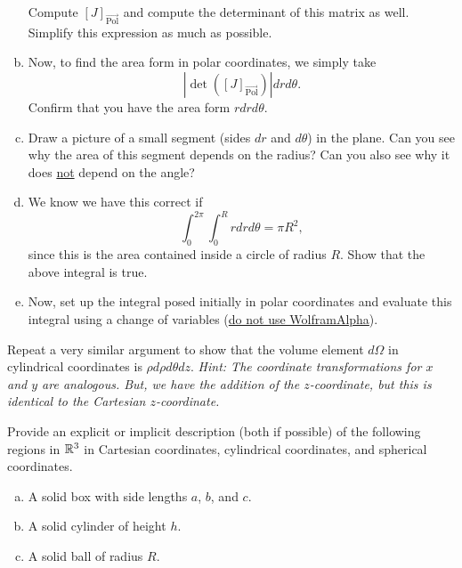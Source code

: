 \documentclass[12pt]{article} %
\begin{document}
\begin{problem}
\begin{enumerate}[(a)]
        Compute $[J]_{\vec{\textrm{Pol}}}$ and compute the determinant of this matrix as well. Simplify this expression as much as possible.
        \item Now, to find the area form in polar coordinates, we simply take
        \[
        \left|\det\left([J]_{\vec{\textrm{Pol}}}\right)\right|drd\theta.
        \]
        Confirm that you have the area form $rdrd\theta$.
        \item Draw a picture of a small segment (sides $dr$ and $d\theta$) in the plane.  Can you see why the area of this segment depends on the radius? Can you also see why it does \underline{not} depend on the angle?
        \item We know we have this correct if 
        \[
        \int_{0}^{2\pi} \int_0^R rdrd\theta = \pi R^2,
        \]
        since this is the area contained inside a circle of radius $R$.  Show that the above integral is true.
        \item Now, set up the integral posed initially in polar coordinates and evaluate this integral using a change of variables (\underline{do not use WolframAlpha}).
    \end{enumerate}
\end{problem}

\vspace*{1cm}
\begin{problem}
    Repeat a very similar argument to show that the volume element $d\Omega$ in cylindrical coordinates is $\rho d\rho d\theta dz$.  \emph{Hint: The coordinate transformations for $x$ and $y$ are analogous.  But, we have the addition of the $z$-coordinate, but this is identical to the Cartesian $z$-coordinate.}
\end{problem}

\vspace*{1cm}
\begin{problem}
Provide an explicit or implicit description (both if possible) of the following regions in $\mathbb{R}^3$ in Cartesian coordinates, cylindrical coordinates, and spherical coordinates.
    \begin{enumerate}[(a)]
        \item A solid box with side lengths $a$, $b$, and $c$.
        \item A solid cylinder of height $h$.
        \item A solid ball of radius $R$.
    \end{enumerate}
\end{problem}
\end{document}
